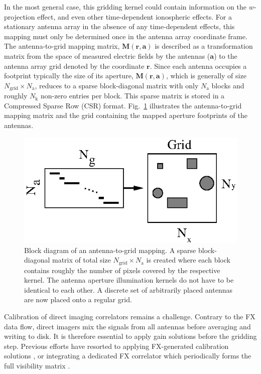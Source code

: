 \documentclass[a4paper,fleqn,usenatbib]{../mnras}
\begin{document}
In the most general case, this gridding kernel could contain information on the
$w$-projection effect, and even other time-dependent ionospheric effects. For a
stationary antenna array in the absence of any time-dependent effects, this
mapping must only be determined once in the antenna array coordinate frame. The
antenna-to-grid mapping matrix, $\mathbf{M}(\mathbf{r},\mathbf{a})$ is described
as a transformation matrix from the space of measured electric fields by the 
antennas ($\mathbf{a}$) to the antenna array grid denoted by the coordinate 
$\mathbf{r}$. Since each antenna occupies a footprint typically the size of its 
aperture, $\mathbf{M}(\mathbf{r},\mathbf{a})$, which is generally of size
$N_\textrm{grid}\times N_\textrm{a}$, reduces to a sparse block-diagonal matrix
with only $N_\textrm{a}$ blocks and roughly $N_\textrm{k}$ non-zero entries per
block. This sparse matrix is stored in a Compressed Sparse Row (CSR) format. 
Fig.~\ref{fig:a2g-mapping} illustrates the antenna-to-grid mapping
matrix and the grid containing the mapped aperture footprints of the antennas.

\begin{figure}
  \includegraphics[width=\columnwidth]{a2g_mapping.eps}
  \caption{Block diagram of an antenna-to-grid mapping. A sparse block-diagonal
    matrix of total size $N_\textrm{grid}\times N_\textrm{a}$ is created where each
    block contains roughly the number of pixels covered by the respective kernel.
    The antenna aperture illumination kernels do not have to be identical to each
    other. A discrete set of arbitrarily placed antennas are now placed onto a
    regular grid.}
  \label{fig:a2g-mapping}
\end{figure}

\par\medskip
{}
\par\medskip
\noindent Calibration of direct imaging correlators remains a challenge. Contrary
to the FX data flow, direct imagers mix the signals from all antennas before
averaging and writing to disk. It is therefore essential to apply gain solutions 
before the gridding step. Previous efforts have resorted to applying FX-generated
calibration solutions \citep{zhe14,fos14}, or integrating a dedicated FX 
correlator which periodically forms the full visibility matrix 
\citep{wij09,dev09}. 
\end{document}
